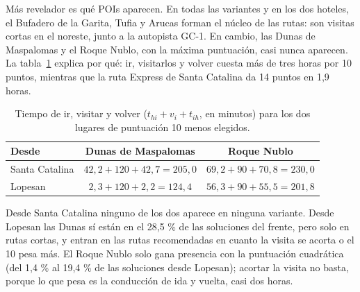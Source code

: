 Más revelador es qué POIs aparecen. En todas las variantes y en los dos hoteles, el Bufadero de la Garita, Tufia y Arucas forman el núcleo de las rutas: son visitas cortas en el noreste, junto a la autopista GC-1. En cambio, las Dunas de Maspalomas y el Roque Nublo, con la máxima puntuación, casi nunca aparecen. La tabla~\ref{tab:iconos} explica por qué: ir, visitarlos y volver cuesta más de tres horas por 10 puntos, mientras que la ruta Express de Santa Catalina da 14 puntos en 1,9 horas.

\begin{table}[H]
\centering
\small
\caption{Tiempo de ir, visitar y volver ($t_{hi} + v_i + t_{ih}$, en minutos) para los dos lugares de puntuación 10 menos elegidos.}
\label{tab:iconos}
\begin{tabular}{@{}l c c@{}}
\toprule
Desde & Dunas de Maspalomas & Roque Nublo \\
\midrule
Santa Catalina & $42{,}2 + 120 + 42{,}7 = 205{,}0$ & $69{,}2 + 90 + 70{,}8 = 230{,}0$ \\
Lopesan & $2{,}3 + 120 + 2{,}2 = 124{,}4$ & $56{,}3 + 90 + 55{,}5 = 201{,}8$ \\
\bottomrule
\end{tabular}
\end{table}

Desde Santa Catalina ninguno de los dos aparece en ninguna variante. Desde Lopesan las Dunas sí están en el 28,5 \% de las soluciones del frente, pero solo en rutas cortas, y entran en las rutas recomendadas en cuanto la visita se acorta o el 10 pesa más. El Roque Nublo solo gana presencia con la puntuación cuadrática (del 1,4 \% al 19,4 \% de las soluciones desde Lopesan); acortar la visita no basta, porque lo que pesa es la conducción de ida y vuelta, casi dos horas.
